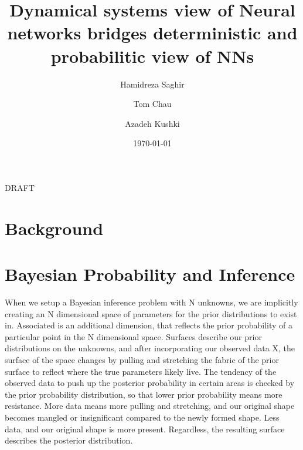 \documentclass[aps,preprint,showpacs,superscriptaddress,groupedaddress]{revtex4}  %
\begin{document}
\hspace{5.2in} \mbox{DRAFT}

\title{Dynamical systems view of Neural networks bridges deterministic and probabilitic view of NNs}

\author{Hamidreza Saghir}
\author{Tom Chau}
\author{Azadeh Kushki}



\date{\today}

\begin{abstract}

\end{abstract}


\maketitle

\section{\label{sec1}Background}


\section{Bayesian Probability and Inference}
When we setup a Bayesian inference problem with N unknowns, we are implicitly creating an N dimensional space of parameters for the prior distributions to exist in. Associated is an additional dimension, that reflects the prior probability of a particular point in the N dimensional space. Surfaces describe our prior distributions on the unknowns, and after incorporating our observed data X, the surface of the space changes by pulling and stretching the fabric of the prior surface to reflect where the true parameters likely live. The tendency of the observed data to push up the posterior probability in certain areas is checked by the prior probability distribution, so that lower prior probability means more resistance. More data means more pulling and stretching, and our original shape becomes mangled or insignificant compared to the newly formed shape. Less data, and our original shape is more present. Regardless, the resulting surface describes the posterior distribution.
 
\end{document}
